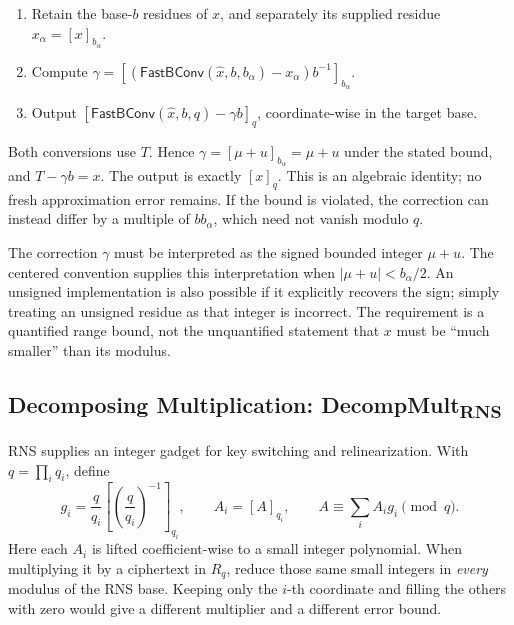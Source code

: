 \begin{tcolorbox}[title={\textbf{\tboxlabel{\ref*{subsec:rns-fastbconvex}} Exact Fast Base Conversion: \textsf{FastBConvEx}}}]
\begin{enumerate}
\item Retain the base-$b$ residues of $x$, and separately its supplied residue $x_\alpha=[x]_{b_\alpha}$.
\item Compute $\gamma=[(\textsf{FastBConv}(\widehat x,b,b_\alpha)-x_\alpha)b^{-1}]_{b_\alpha}$.
\item Output $[\textsf{FastBConv}(\widehat x,b,q)-\gamma b]_q$, coordinate-wise in the target base.
\end{enumerate}
\end{tcolorbox}

\begin{myproof}
Both conversions use $T$. Hence $\gamma=[\mu+u]_{b_\alpha}=\mu+u$ under the stated bound, and $T-\gamma b=x$. The output is exactly $[x]_q$. This is an algebraic identity; no fresh approximation error remains. If the bound is violated, the correction can instead differ by a multiple of $bb_\alpha$, which need not vanish modulo $q$.
\end{myproof}

 The correction $\gamma$ must be interpreted as the signed bounded integer $\mu+u$. The centered convention supplies this interpretation when $|\mu+u|<b_\alpha/2$. An unsigned implementation is also possible if it explicitly recovers the sign; simply treating an unsigned residue as that integer is incorrect. The requirement is a quantified range bound, not the unquantified statement that $x$ must be ``much smaller'' than its modulus.


\subsection{Decomposing Multiplication: \textsf{DecompMult\textsubscript{RNS}}}
\label{subsec:rns-decompmult}

RNS supplies an integer gadget for key switching and relinearization. With $q=\prod_iq_i$, define
\[
g_i=\frac q{q_i}\left[\left(\frac q{q_i}\right)^{-1}\right]_{q_i},\qquad
A_i=[A]_{q_i},\qquad A\equiv\sum_iA_ig_i\pmod q.
\]
Here each $A_i$ is lifted coefficient-wise to a small integer polynomial. When multiplying it by a ciphertext in $R_q$, reduce those same small integers in \emph{every} modulus of the RNS base. Keeping only the $i$-th coordinate and filling the others with zero would give a different multiplier and a different error bound.

